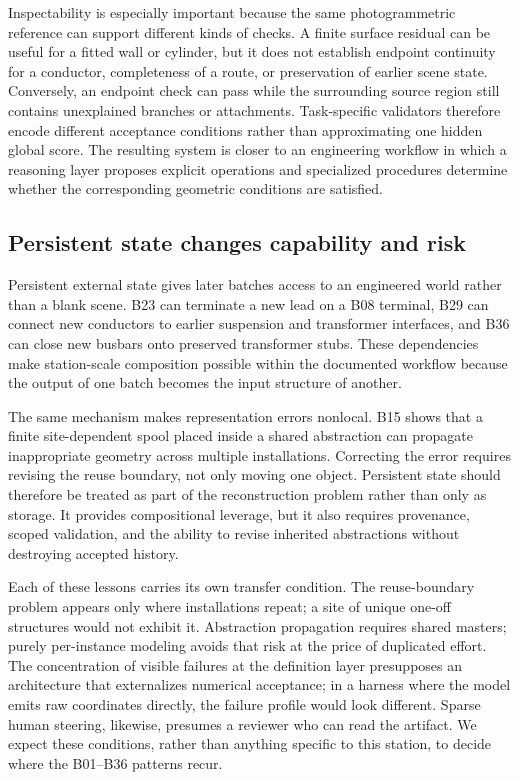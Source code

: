 \documentclass[10pt,a4paper]{article}
\begin{document}
Inspectability is especially important because the same photogrammetric
reference can support different kinds of checks. A finite surface
residual can be useful for a fitted wall or cylinder, but it does not
establish endpoint continuity for a conductor, completeness of a route,
or preservation of earlier scene state. Conversely, an endpoint check
can pass while the surrounding source region still contains unexplained
branches or attachments. Task-specific validators therefore encode
different acceptance conditions rather than approximating one hidden
global score. The resulting system is closer to an engineering workflow
in which a reasoning layer proposes explicit operations and specialized
procedures determine whether the corresponding geometric conditions are
satisfied.

\hypertarget{persistent-state-changes-capability-and-risk}{%
\subsection{Persistent state changes capability and
risk}\label{persistent-state-changes-capability-and-risk}}

Persistent external state gives later batches access to an engineered
world rather than a blank scene. B23 can terminate a new lead on a B08
terminal, B29 can connect new conductors to earlier suspension and
transformer interfaces, and B36 can close new busbars onto preserved
transformer stubs. These dependencies make station-scale composition
possible within the documented workflow because the output of one batch
becomes the input structure of another.

The same mechanism makes representation errors nonlocal. B15 shows that
a finite site-dependent spool placed inside a shared abstraction can
propagate inappropriate geometry across multiple installations.
Correcting the error requires revising the reuse boundary, not only
moving one object. Persistent state should therefore be treated as part
of the reconstruction problem rather than only as storage. It provides
compositional leverage, but it also requires provenance, scoped
validation, and the ability to revise inherited abstractions without
destroying accepted history.

Each of these lessons carries its own transfer condition. The
reuse-boundary problem appears only where installations repeat; a site
of unique one-off structures would not exhibit it. Abstraction
propagation requires shared masters; purely per-instance modeling avoids
that risk at the price of duplicated effort. The concentration of
visible failures at the definition layer presupposes an architecture
that externalizes numerical acceptance; in a harness where the model
emits raw coordinates directly, the failure profile would look
different. Sparse human steering, likewise, presumes a reviewer who can
read the artifact. We expect these conditions, rather than anything
specific to this station, to decide where the B01--B36 patterns recur.
\end{document}
